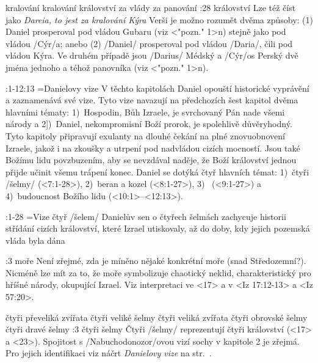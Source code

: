     {kralování}  %
    {kralování}  %
    {království}  %
    {za vlády}  %
    {za panování}  %
:28 {království} Lze též  číst jako {\em Dareia, to jest za kralování Kýra}     Verši je možno rozumět dvěma způsoby: (1) Daniel prosperoval pod vládou Gubaru  (viz <"pozn." 1>n) stejně jako pod vládou \x/Cýr/a; anebo (2) \x/Daniel/ prosperoval pod vládou \x/Daria/, čili pod vládou Kýra. Ve druhém případě jsou  \x/Darius/ Médský a \x/Cýr/os Perský dvě jména jednoho a téhož panovníka  (viz <"pozn." 1>n).



:1-12:13 {}={Danielovy vize} 
     V těchto kapitolách Daniel opouští historické vyprávění
     a zaznamenává své vize. Tyto vize navazují na předchozích šest kapitol dvěma hlavními tématy: 
     1)~Hospodin, Bůh Izraele, je svrchovaný Pán nade všemi národy a 
     2])~Daniel, nekompromisní Boží prorok, je spolehlivě důvěryhodný. Tyto kapitoly připravují exulanty na dlouhé čekání na plné znovuobnovení Izraele, jakož i na zkoušky a utrpení pod
        nadvládou cizích mocností. Jsou také Božímu lidu povzbuzením, aby se nevzdával naděje,
        že Boží království jednou přijde učinit všemu trápení konec. Daniel se dotýká čtyř
        hlavních témat: 1)~čtyři \x/šelmy/ (<7:1-28>),  
                        2)~beran a kozel (<8:1-27>),
                        3)~ (<9:1-27>) a 
                        4)~budoucnost Božího lidu (<10:1>--<12:13>).   


:1-28 {}={Vize čtyř \x/šelem/}
     Danielův sen o čtyřech šelmách zachycuje historii střídání cizích
     království, které Izrael utiskovaly, až do doby, kdy jejich pozemská vláda byla dána 

:3 {moře} 
     Není zřejmé, zda je míněno nějaké konkrétní moře (snad Středozemní?). Nicméně
     lze mít za to, že moře symbolizuje chaotický neklid, charakteristický pro hříšné národy,
     okupující Izrael. Viz interpretaci ve  <17> a v <Iz 17:12-13> a <Iz 57:20>. 



   {čtyři převeliká zvířata}   %
   {čtyři veliké šelmy}   %
   {čtyři veliká zvířata}   %
   {čtyři obrovské šelmy}   %
   {čtyři dravé šelmy}   %
:3 {čtyři šelmy}
    Čtyři \x/šelmy/ reprezentují čtyři království (<17> a <23>).
    Spojitost  s \x/Nabuchodonozor/ovou vizí sochy v kapitole 2 je zřejmá. Pro jejich identifikaci viz náčrt      {\it Danielovy vize\/} na str.~\pgref[danielovyvize]. 

